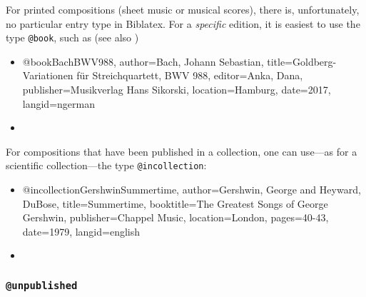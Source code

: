 For printed compositions (sheet music or musical scores), there is,
unfortunately, no particular entry type in Biblatex. For a \emph{specific}
edition, it is easiest to use the type \texttt{@book}, such as (see also
\cite{HaydnCelloConcerto2,ShostakovichOp110})
%
\begin{itemize}
\item[]
\begin{GenericCode}[numbers=none]
@book{BachBWV988,
  author={Bach, Johann Sebastian},
  title={Goldberg-Variationen für Streichquartett, BWV 988},
  editor={Anka, Dana},
  publisher={Musikverlag Hans Sikorski},
  location={Hamburg},
  date={2017},
  langid={ngerman}
}
\end{GenericCode}
\item[\cite{BachBWV988}] 
\end{itemize}
%
For compositions that have been published in a collection, one can use---as for
a scientific collection---the type \texttt{@incollection}:
%
\begin{itemize}
\item[]
\begin{GenericCode}[numbers=none]
@incollection{GershwinSummertime,
  author={Gershwin, George and Heyward, DuBose},
  title={Summertime},
  booktitle={The Greatest Songs of George Gershwin},
  publisher={Chappel Music},
  location={London},
  pages={40-43},
  date={1979},
  langid={english}
}
\end{GenericCode}
\item[\cite{GershwinSummertime}] 
\end{itemize}

\subsubsection{\texttt{\bfseries @unpublished}}
\label{sec:@unpublished}

